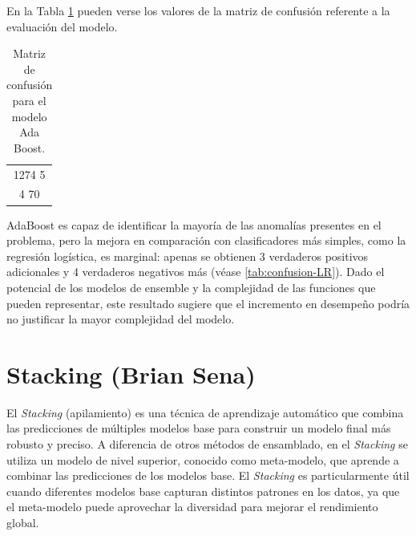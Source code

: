 \documentclass[12pt,letterpaper]{article}
\begin{document}
En la Tabla \ref{tab:confusion-AdaBoost} pueden verse los valores de la matriz de confusión referente a la evaluación del modelo.

\begin{table}[H]
    \centering
    \begin{tabular}{|c|}
    \hline
    1274 \hspace{8mm} 5 \\ 
    4 \hspace{10mm} 70 \\ \hline
    \end{tabular}
    \caption{Matriz de confusión para el modelo Ada Boost.}
    \label{tab:confusion-AdaBoost}
\end{table}

AdaBoost es capaz de identificar la mayoría de las anomalías presentes en el problema, pero la mejora en comparación con clasificadores más simples, como la regresión logística, es marginal: apenas se obtienen 3 verdaderos positivos adicionales y 4 verdaderos negativos más (véase \ref{tab:confusion-LR}). Dado el potencial de los modelos de ensemble y la complejidad de las funciones que pueden representar, este resultado sugiere que el incremento en desempeño podría no justificar la mayor complejidad del modelo.
\section{Stacking (Brian Sena)}
El \textit{Stacking} (apilamiento) es una técnica de aprendizaje automático que combina las predicciones de múltiples modelos base para construir un modelo final más robusto y preciso. 
A diferencia de otros métodos de ensamblado, en el \textit{Stacking} se utiliza un modelo de nivel superior, conocido como meta-modelo, que aprende a combinar las predicciones de los modelos base.
El \textit{Stacking} es particularmente útil cuando diferentes modelos base capturan distintos patrones en los datos, ya que el meta-modelo puede aprovechar la diversidad para mejorar el rendimiento global. 
\end{document}
